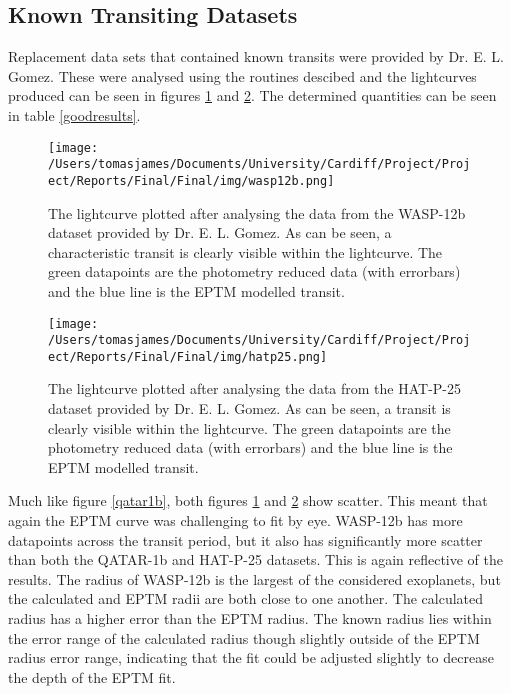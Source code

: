 \documentclass{report}
\begin{document}
\subsection{Known Transiting Datasets}
Replacement data sets that contained known transits were provided by Dr. E. L. Gomez. These were analysed using the routines descibed and the lightcurves produced can be seen in figures \ref{wasp12b} and \ref{hatp25}. The determined quantities can be seen in table \ref{goodresults}.

\begin{figure*}[t!]
\centering
    \begin{subfigure}[t]{0.45\textwidth}
    \centering
        \texttt{[image: /Users/tomasjames/Documents/University/Cardiff/Project/Project/Reports/Final/Final/img/wasp12b.png]}
    \caption{The lightcurve plotted after analysing the data from the WASP-12b dataset provided by Dr. E. L. Gomez. As can be seen, a characteristic transit is clearly visible within the lightcurve. The green datapoints are the photometry reduced data (with errorbars) and the blue line is the EPTM modelled transit.} \label{wasp12b}
    \end{subfigure}
    \quad
    \begin{subfigure}[t]{0.45\textwidth}
    \centering
        \texttt{[image: /Users/tomasjames/Documents/University/Cardiff/Project/Project/Reports/Final/Final/img/hatp25.png]}
    \caption{The lightcurve plotted after analysing the data from the HAT-P-25 dataset provided by Dr. E. L. Gomez. As can be seen, a transit is clearly visible within the lightcurve. The green datapoints are the photometry reduced data (with errorbars) and the blue line is the EPTM modelled transit.} \label{hatp25}
    \end{subfigure}
    \caption{Transit lightcurves analysed using GAIA photometry for datasets provided by Dr. E. L. Gomez.}
\end{figure*}

Much like figure \ref{qatar1b}, both figures \ref{wasp12b} and \ref{hatp25} show scatter. This meant that again the EPTM curve was challenging to fit by eye. WASP-12b has more datapoints across the transit period, but it also has significantly more scatter than both the QATAR-1b and HAT-P-25 datasets. This is again reflective of the results. The radius of WASP-12b is the largest of the considered exoplanets, but the calculated and EPTM radii are both close to one another. The calculated radius has a higher error than the EPTM radius. The known radius lies within the error range of the calculated radius though slightly outside of the EPTM radius error range, indicating that the fit could be adjusted slightly to decrease the depth of the EPTM fit. 
\end{document}
